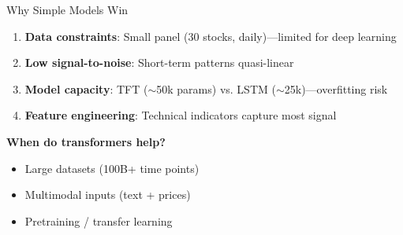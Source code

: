 \documentclass[aspectratio=169,xcolor={dvipsnames}]{beamer}
\begin{document}
\begin{frame}{Why Simple Models Win}
  \begin{enumerate}
    \item \textbf{Data constraints}: Small panel (30 stocks, daily)—limited for deep learning
    
    \item \textbf{Low signal-to-noise}: Short-term patterns quasi-linear
    
    \item \textbf{Model capacity}: TFT ($\sim$50k params) vs. LSTM ($\sim$25k)—overfitting risk
    
    \item \textbf{Feature engineering}: Technical indicators capture most signal
  \end{enumerate}
  
  \vspace{0.5cm}
  
  \textbf{When do transformers help?}
  \begin{itemize}
    \item Large datasets (100B+ time points)
    \item Multimodal inputs (text + prices)
    \item Pretraining / transfer learning
  \end{itemize}
\end{frame}
\end{document}
